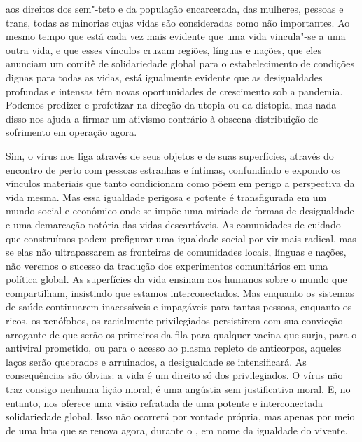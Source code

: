 \begin{multicols}{2}
aos direitos dos sem"-teto e da população encarcerada, das mulheres,
pessoas {} e trans, todas as minorias cujas vidas são
consideradas como não importantes. Ao mesmo tempo que está cada vez mais
evidente que uma vida vincula"-se a uma outra vida, e que esses vínculos
cruzam regiões, línguas e nações, que eles anunciam um comitê de
solidariedade global para o estabelecimento de condições dignas para
todas as vidas, está igualmente evidente que as desigualdades profundas
e intensas têm novas oportunidades de crescimento sob a pandemia.
Podemos predizer e profetizar na direção da utopia ou da distopia, mas
nada disso nos ajuda a firmar um ativismo contrário à obscena
distribuição de sofrimento em operação agora.

Sim, o vírus nos liga através de seus objetos e de suas superfícies,
através do encontro de perto com pessoas estranhas e íntimas,
confundindo e expondo os vínculos materiais que tanto condicionam como
põem em perigo a perspectiva da vida mesma. Mas essa igualdade perigosa
e potente é transfigurada em um mundo social e econômico onde se impõe
uma miríade de formas de desigualdade e uma demarcação notória das vidas
descartáveis. As comunidades de cuidado que construímos podem prefigurar
uma igualdade social por vir mais radical, mas se elas não ultrapassarem
as fronteiras de comunidades locais, línguas e nações, não veremos o
sucesso da tradução dos experimentos comunitários em uma política
global. As superfícies da vida ensinam aos humanos sobre o mundo que
compartilham, insistindo que estamos interconectados. Mas enquanto os
sistemas de saúde continuarem inacessíveis e impagáveis para tantas
pessoas, enquanto os ricos, os xenófobos, os racialmente privilegiados
persistirem com sua convicção arrogante de que serão os primeiros da
fila para qualquer vacina que surja, para o antiviral prometido, ou para
o acesso ao plasma repleto de anticorpos, aqueles laços serão quebrados
e arruinados, a desigualdade se intensificará. As consequências são
óbvias: a vida é um direito só dos privilegiados. O vírus não traz
consigo nenhuma lição moral; é uma angústia sem justificativa moral. E,
no entanto, nos oferece uma visão refratada de uma potente e
interconectada solidariedade global. Isso não ocorrerá por vontade
própria, mas apenas por meio de uma luta que se renova agora, durante o
{}, em nome da igualdade do vivente.

\noindent{}\textcolor{gray}{\footnotesize{}}

\end{multicols}

